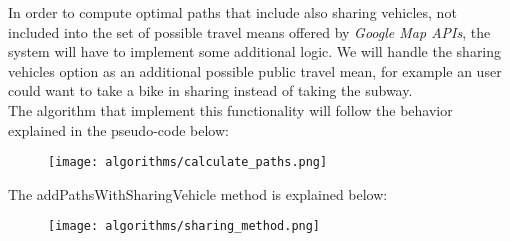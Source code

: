 In order to compute optimal paths that include also sharing vehicles, not included into the set of possible travel means offered by \textit{Google Map APIs}, the system will have to implement some additional logic. We will handle the sharing vehicles option as an additional possible public travel mean, for example an user could want to take a bike in sharing instead of taking the subway.\\
The algorithm that implement this functionality will follow the behavior explained in the pseudo-code below:
\begin{figure}[H]
\begin{center}
		\texttt{[image: algorithms/calculate\_paths.png]}
\end{center}
\end{figure}
\noindent The addPathsWithSharingVehicle method is explained below:
\begin{figure}[H]
\begin{center}
		\texttt{[image: algorithms/sharing\_method.png]}
		
\end{center}
\end{figure}
